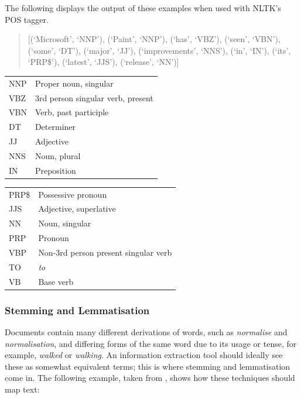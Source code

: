 The following displays the output of these examples when used with NLTK's POS tagger.
\begin{quote}
[(`Microsoft', `NNP'), (`Paint', `NNP'), (`has', `VBZ'), (`seen', `VBN'), (`some', `DT'), (`major', `JJ'), (`improvements', `NNS'), (`in', `IN'), (`its', `PRP\$'), (`latest', `JJS'), (`release', `NN')]
\newline
{}
\end{quote}
\begin{minipage}[b]{0.5\linewidth}\centering
\begin{tabular}{l | l}
\hline
  NNP&Proper noun, singular\\
  VBZ&3rd person singular verb, present\\
  VBN&Verb, past participle\\
  DT&Determiner\\
  JJ&Adjective\\
  NNS&Noun, plural\\
  IN&Preposition\\
\hline
\end{tabular}
\end{minipage}
\begin{minipage}[b]{0.5\linewidth}\centering
\begin{tabular}{l | l}
\hline
  PRP\$&Possessive pronoun\\
  JJS&Adjective, superlative\\
  NN&Noun, singular\\
  PRP&Pronoun\\
  VBP&Non-3rd person present singular verb\\
  TO&\emph{to}\\
  VB&Base verb\\
\hline
\end{tabular}
\end{minipage}

\subsubsection{Stemming and Lemmatisation}
Documents contain many different derivations of words, such as \emph{normalise} and \emph{normalisation}, and differing forms of the same word due to its usage or tense, for example, \emph{walked} or \emph{walking}. An information extraction tool should ideally see these as somewhat equivalent terms; this is where stemming and lemmatisation come in. The following example, taken from \cite{manning2008}, shows how these techniques should map text:

